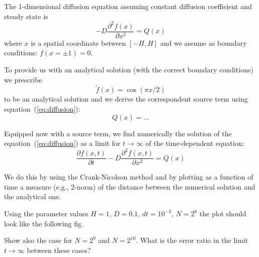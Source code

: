 \documentclass[10pt]{article}
\begin{document}
The 1-dimensional diffusion equation assuming constant diffusion coefficient and steady state is
%
\begin{equation}\label{eq:diffusion}
-D\frac{\partial^2 f(x)}{\partial x^2} = Q(x)
\end{equation}
%
where $x$ is a spatial coordinate between $[-H,H]$ and we assume as boundary conditions: $f(x = \pm 1) = 0$.

To provide us with an analytical solution (with the correct boundary conditions) we prescribe 
%
\begin{equation}
\tilde f(x) = \cos(\pi x / 2)
\end{equation}
%
to be an analytical solution and we derive the correspondent source term using equation~(\ref{eq:diffusion}):
%
\begin{equation}
Q(x) = \dots 
\end{equation}

Equipped now with a source term, we find numerically the solution of the equation~(\ref{eq:diffusion}) as a limit for $t \rightarrow \infty$ of the time-dependent equation:
%
\begin{equation}
\frac{\partial f(x,t)}{\partial t} -D \frac{\partial^2 f(x,t)}{\partial x^2} = Q(x)
\end{equation}

We do this by using the Crank-Nicolson method and by plotting as a function of time a measure (e.g., 2-norm) of the distance between the numerical solution and the analytical one.

\begin{question}
Using the parameter values $H = 1$, $D = 0.1$, $dt = 10^{-3}$, $N = 2^8$ the plot should look like the following fig.
\end{question}


\begin{question}
Show also the case for $N = 2^9$ and $N = 2^{10}$. What is the error ratio in the limit $t \rightarrow \infty$ between these cases?
\end{question}
\end{document}
